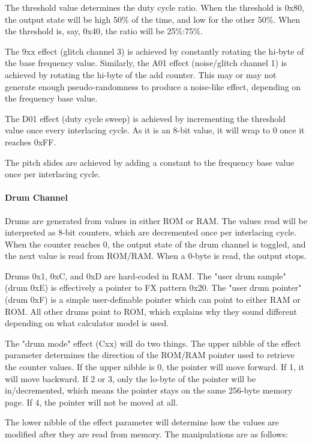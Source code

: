 \documentclass[12pt]{report}	%
\begin{document}
\begin{appendices}
The threshold value determines the duty cycle ratio. When the threshold is 0x80, the output state will be high 50\% of the time, and low for the other 50\%. When the threshold is, say, 0x40, the ratio will be 25\%:75\%.

The 9xx effect (glitch channel 3) is achieved by constantly rotating the hi-byte of the base frequency value. Similarly, the A01 effect (noise/glitch channel 1) is achieved by rotating the hi-byte of the add counter. This may or may not generate enough pseudo-randomness to produce a noise-like effect, depending on the frequency base value.

The D01 effect (duty cycle sweep) is achieved by incrementing the threshold value once every interlacing cycle. As it is an 8-bit value, it will wrap to 0 once it reaches 0xFF.

The pitch slides are achieved by adding a constant to the frequency base value once per interlacing cycle.

\paragraph{Drum Channel} Drums are generated from values in either ROM or RAM. The values read will be interpreted as 8-bit counters, which are decremented once per interlacing cycle. When the counter reaches 0, the output state of the drum channel is toggled, and the next value is read from ROM/RAM. When a 0-byte is read, the output stops.

Drums 0x1, 0xC, and 0xD are hard-coded in RAM. The "user drum sample" (drum 0xE) is effectively a pointer to FX pattern 0x20. The "user drum pointer" (drum 0xF) is a simple user-definable pointer which can point to either RAM or ROM. All other drums point to ROM, which explains why they sound different depending on what calculator model is used.

The "drum mode" effect (Cxx) will do two things. The upper nibble of the effect parameter determines the direction of the ROM/RAM pointer used to retrieve the counter values. If the upper nibble is 0, the pointer will move forward. If 1, it will move backward. If 2 or 3, only the lo-byte of the pointer will be in/decremented, which means the pointer stays on the same 256-byte memory page. If 4, the pointer will not be moved at all.

The lower nibble of the effect parameter will determine how the values are modified after they are read from memory. The manipulations are as follows: \newline


\end{appendices}
\end{document}
